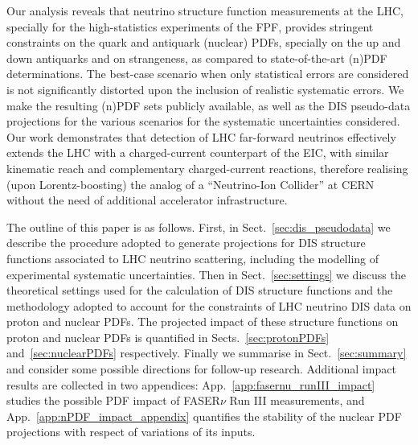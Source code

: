 Our analysis reveals that  neutrino structure function measurements at the LHC, specially
for the high-statistics  experiments of the FPF, provides  stringent constraints
on the quark and antiquark (nuclear) PDFs, specially on the up and down
antiquarks and on strangeness, as compared to state-of-the-art (n)PDF determinations.
%
The best-case scenario when only statistical errors are considered is not
significantly distorted upon the inclusion of realistic systematic errors.
%
We make the resulting (n)PDF sets publicly available, as well as the DIS pseudo-data projections
for the various scenarios for the systematic uncertainties considered.
%
Our work demonstrates that detection of LHC far-forward neutrinos  effectively
extends the LHC with a charged-current counterpart of the EIC,
with similar kinematic reach and complementary charged-current reactions,
therefore realising (upon Lorentz-boosting) the analog of a ``Neutrino-Ion Collider'' at CERN
without the need of additional accelerator infrastructure.


The outline of this paper is as follows.
%
First, in Sect.~\ref{sec:dis_pseudodata} we describe the procedure
adopted to generate projections for DIS structure functions associated to
LHC neutrino scattering, including the modelling of experimental systematic
uncertainties.
%
Then in Sect.~\ref{sec:settings} we discuss the theoretical settings used
for the calculation of DIS structure functions and the methodology adopted
to account for the constraints of LHC neutrino DIS data on proton and nuclear PDFs.
%
The projected impact of these structure functions on proton and nuclear
PDFs is quantified in Sects.~\ref{sec:protonPDFs} and~\ref{sec:nuclearPDFs} respectively.
%
Finally we summarise in Sect.~\ref{sec:summary} and consider some possible
directions for follow-up research.
%
Additional impact results are collected in two appendices:
App.~\ref{app:fasernu_runIII_impact} studies the possible PDF impact
of FASER$\nu$ Run III measurements, and App.~\ref{app:nPDF_impact_appendix}
quantifies the stability of the nuclear PDF projections with respect
of variations of its inputs.
